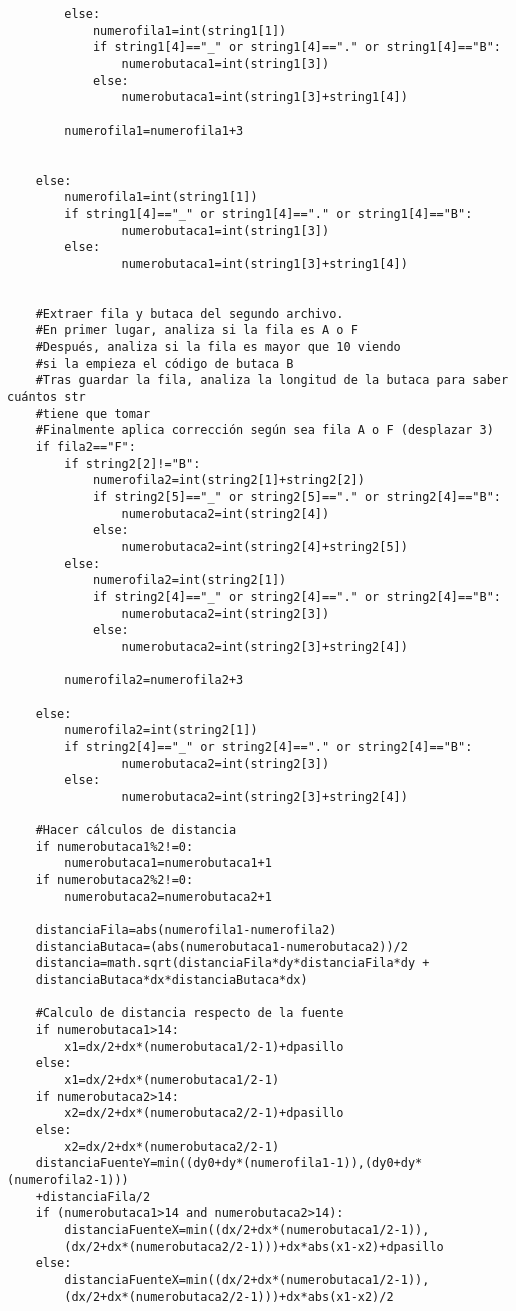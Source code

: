 \documentclass[11pt,a4paper,twoside]{book}
\begin{document}
\begin{verbatim}
        else:
            numerofila1=int(string1[1])
            if string1[4]=="_" or string1[4]=="." or string1[4]=="B":
                numerobutaca1=int(string1[3])
            else:
                numerobutaca1=int(string1[3]+string1[4])

        numerofila1=numerofila1+3


    else:
        numerofila1=int(string1[1])
        if string1[4]=="_" or string1[4]=="." or string1[4]=="B":
                numerobutaca1=int(string1[3])
        else:
                numerobutaca1=int(string1[3]+string1[4])


    #Extraer fila y butaca del segundo archivo. 
    #En primer lugar, analiza si la fila es A o F
    #Después, analiza si la fila es mayor que 10 viendo 
    #si la empieza el código de butaca B
    #Tras guardar la fila, analiza la longitud de la butaca para saber cuántos str 
    #tiene que tomar
    #Finalmente aplica corrección según sea fila A o F (desplazar 3)
    if fila2=="F":
        if string2[2]!="B":
            numerofila2=int(string2[1]+string2[2])
            if string2[5]=="_" or string2[5]=="." or string2[4]=="B":
                numerobutaca2=int(string2[4])
            else:
                numerobutaca2=int(string2[4]+string2[5])
        else:
            numerofila2=int(string2[1])
            if string2[4]=="_" or string2[4]=="." or string2[4]=="B":
                numerobutaca2=int(string2[3])
            else:
                numerobutaca2=int(string2[3]+string2[4])

        numerofila2=numerofila2+3

    else:
        numerofila2=int(string2[1])
        if string2[4]=="_" or string2[4]=="." or string2[4]=="B":
                numerobutaca2=int(string2[3])
        else:
                numerobutaca2=int(string2[3]+string2[4])

    #Hacer cálculos de distancia
    if numerobutaca1%2!=0:
        numerobutaca1=numerobutaca1+1
    if numerobutaca2%2!=0:
        numerobutaca2=numerobutaca2+1

    distanciaFila=abs(numerofila1-numerofila2)
    distanciaButaca=(abs(numerobutaca1-numerobutaca2))/2
    distancia=math.sqrt(distanciaFila*dy*distanciaFila*dy +
    distanciaButaca*dx*distanciaButaca*dx)

    #Calculo de distancia respecto de la fuente
    if numerobutaca1>14:
        x1=dx/2+dx*(numerobutaca1/2-1)+dpasillo
    else:
        x1=dx/2+dx*(numerobutaca1/2-1)
    if numerobutaca2>14:
        x2=dx/2+dx*(numerobutaca2/2-1)+dpasillo
    else:
        x2=dx/2+dx*(numerobutaca2/2-1)
    distanciaFuenteY=min((dy0+dy*(numerofila1-1)),(dy0+dy*(numerofila2-1)))
    +distanciaFila/2
    if (numerobutaca1>14 and numerobutaca2>14):
        distanciaFuenteX=min((dx/2+dx*(numerobutaca1/2-1)),
        (dx/2+dx*(numerobutaca2/2-1)))+dx*abs(x1-x2)+dpasillo
    else:
        distanciaFuenteX=min((dx/2+dx*(numerobutaca1/2-1)),
        (dx/2+dx*(numerobutaca2/2-1)))+dx*abs(x1-x2)/2


\end{verbatim}
\end{document}
